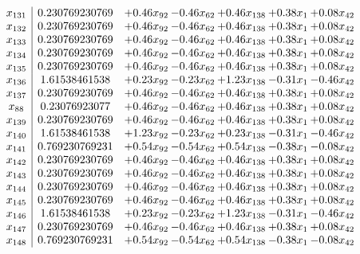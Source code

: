 \documentclass[8pt]{article}
\begin{document}
\[\begin{array}{c| c c@{\hskip 2pt} c@{\hskip 2pt} c@{\hskip 2pt} c@{\hskip 2pt} c@{\hskip 2pt} }
 x_{131}   &  0.230769230769 & +  0.46 x_{92} & -0.46 x_{62} & +  0.46 x_{138} & +  0.38 x_{1} & +  0.08 x_{42}\\
 x_{132}   &  0.230769230769 & +  0.46 x_{92} & -0.46 x_{62} & +  0.46 x_{138} & +  0.38 x_{1} & +  0.08 x_{42}\\
 x_{133}   &  0.230769230769 & +  0.46 x_{92} & -0.46 x_{62} & +  0.46 x_{138} & +  0.38 x_{1} & +  0.08 x_{42}\\
 x_{134}   &  0.230769230769 & +  0.46 x_{92} & -0.46 x_{62} & +  0.46 x_{138} & +  0.38 x_{1} & +  0.08 x_{42}\\
 x_{135}   &  0.230769230769 & +  0.46 x_{92} & -0.46 x_{62} & +  0.46 x_{138} & +  0.38 x_{1} & +  0.08 x_{42}\\
 x_{136}   &  1.61538461538 & +  0.23 x_{92} & -0.23 x_{62} & +  1.23 x_{138} & -0.31 x_{1} & -0.46 x_{42}\\
 x_{137}   &  0.230769230769 & +  0.46 x_{92} & -0.46 x_{62} & +  0.46 x_{138} & +  0.38 x_{1} & +  0.08 x_{42}\\
 x_{88}   &  0.23076923077 & +  0.46 x_{92} & -0.46 x_{62} & +  0.46 x_{138} & +  0.38 x_{1} & +  0.08 x_{42}\\
 x_{139}   &  0.230769230769 & +  0.46 x_{92} & -0.46 x_{62} & +  0.46 x_{138} & +  0.38 x_{1} & +  0.08 x_{42}\\
 x_{140}   &  1.61538461538 & +  1.23 x_{92} & -0.23 x_{62} & +  0.23 x_{138} & -0.31 x_{1} & -0.46 x_{42}\\
 x_{141}   &  0.769230769231 & +  0.54 x_{92} & -0.54 x_{62} & +  0.54 x_{138} & -0.38 x_{1} & -0.08 x_{42}\\
 x_{142}   &  0.230769230769 & +  0.46 x_{92} & -0.46 x_{62} & +  0.46 x_{138} & +  0.38 x_{1} & +  0.08 x_{42}\\
 x_{143}   &  0.230769230769 & +  0.46 x_{92} & -0.46 x_{62} & +  0.46 x_{138} & +  0.38 x_{1} & +  0.08 x_{42}\\
 x_{144}   &  0.230769230769 & +  0.46 x_{92} & -0.46 x_{62} & +  0.46 x_{138} & +  0.38 x_{1} & +  0.08 x_{42}\\
 x_{145}   &  0.230769230769 & +  0.46 x_{92} & -0.46 x_{62} & +  0.46 x_{138} & +  0.38 x_{1} & +  0.08 x_{42}\\
 x_{146}   &  1.61538461538 & +  0.23 x_{92} & -0.23 x_{62} & +  1.23 x_{138} & -0.31 x_{1} & -0.46 x_{42}\\
 x_{147}   &  0.230769230769 & +  0.46 x_{92} & -0.46 x_{62} & +  0.46 x_{138} & +  0.38 x_{1} & +  0.08 x_{42}\\
 x_{148}   &  0.769230769231 & +  0.54 x_{92} & -0.54 x_{62} & +  0.54 x_{138} & -0.38 x_{1} & -0.08 x_{42}\\

\end{array}\]
\end{document}
